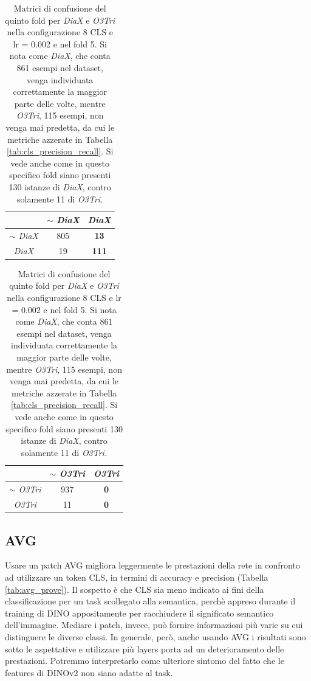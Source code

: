 \begin{table}[p]
    \centering
    \setlength{\tabcolsep}{5pt} %
    \renewcommand{\arraystretch}{1.6} %
    
    \begin{minipage}{0.4\linewidth}
        \centering
        \raggedright
        \begin{tabular}{c|c|c}
                  & $\sim$ \textit{DiaX} & \textit{DiaX} \\
            \hline
            $\sim$ \textit{DiaX} &  805  & \textbf{13} \\
            \hline
            \textit{DiaX} &  19   & \textbf{111} \\
        \end{tabular}
    \end{minipage}%
    \begin{minipage}{0.4\linewidth}
        \centering
        \raggedleft
        \begin{tabular}{c|c|c}
              & $\sim$ \textit{O3Tri} & \textit{O3Tri} \\
        \hline
        $\sim$ \textit{O3Tri} &  937  & \textbf{0} \\
        \hline
        \textit{O3Tri} &  11   & \textbf{0} \\
    \end{tabular}
    \end{minipage}
        
    
    \caption{Matrici di confusione del quinto fold per \textit{DiaX} e \textit{O3Tri} nella configurazione 8 CLS e lr = 0.002 e nel fold 5. Si nota come \textit{DiaX}, che conta 861 esempi nel dataset, venga individuata correttamente la maggior parte delle volte, mentre \textit{O3Tri}, 115 esempi, non venga mai predetta, da cui le metriche azzerate in Tabella \ref{tab:cls_precision_recall}. Si vede anche come in questo specifico fold siano presenti 130 istanze di \textit{DiaX}, contro solamente 11 di \textit{O3Tri.}}
    \label{tab:conf_mat}
    
\end{table}


\subsection{AVG}
Usare un patch AVG migliora leggermente le prestazioni della rete in confronto ad utilizzare un token CLS, in termini di accuracy e precision (Tabella \ref{tab:avg_prove}). Il sospetto è che CLS sia meno indicato ai fini della classificazione per un task scollegato alla semantica, perchè appreso durante il training di DINO appositamente per racchiudere il significato semantico dell'immagine. Mediare i patch, invece, può fornire informazioni più varie su cui distinguere le diverse classi. In generale, però, anche usando AVG i risultati sono sotto le aspettative e utilizzare più layers porta ad un deterioramento delle prestazioni. Potremmo interpretarlo come ulteriore sintomo del fatto che le features di DINOv2 non siano adatte al task. 

